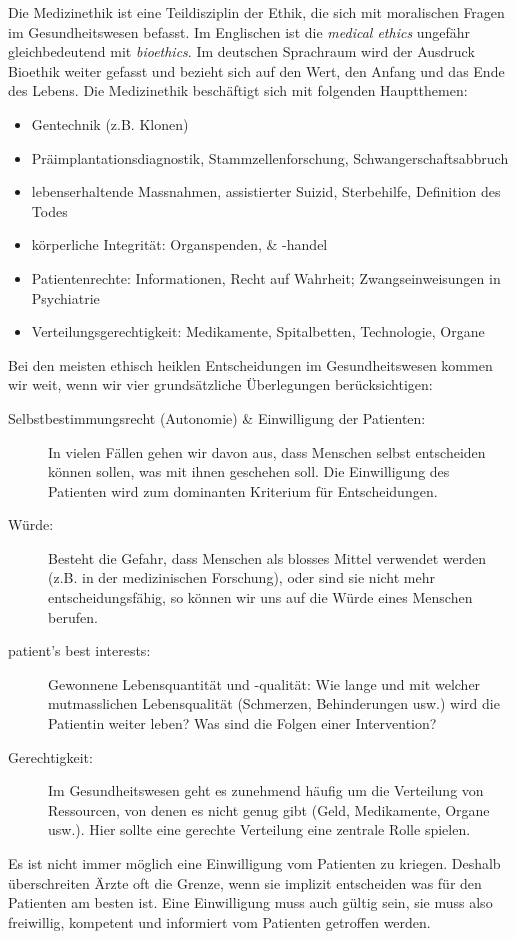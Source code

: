 Die Medizinethik ist eine Teildisziplin der Ethik, die sich mit moralischen Fragen im Gesundheitswesen befasst. Im Englischen ist die \textit{medical ethics} ungefähr gleichbedeutend mit \textit{bioethics}. Im deutschen Sprachraum wird der Ausdruck Bioethik weiter gefasst und bezieht sich auf den Wert, den Anfang und das Ende des Lebens. Die Medizinethik beschäftigt sich mit folgenden Hauptthemen:
\begin{itemize}
	\item Gentechnik (z.B. Klonen)
	\item Präimplantationsdiagnostik, Stammzellenforschung, Schwangerschaftsabbruch
	\item lebenserhaltende Massnahmen, assistierter Suizid, Sterbehilfe, Definition des Todes
	\item körperliche Integrität: Organspenden, \& -handel
	\item Patientenrechte: Informationen, Recht auf Wahrheit; Zwangseinweisungen in Psychiatrie
	\item Verteilungsgerechtigkeit: Medikamente, Spitalbetten, Technologie, Organe
\end{itemize}
Bei den meisten ethisch heiklen Entscheidungen im Gesundheitswesen kommen wir weit, wenn wir vier grundsätzliche Überlegungen berücksichtigen:
\begin{description}
	\item[Selbstbestimmungsrecht (Autonomie) \& Einwilligung der Patienten:] In vielen Fällen gehen wir davon aus, dass Menschen selbst entscheiden können sollen, was mit ihnen geschehen soll. Die Einwilligung des Patienten wird zum dominanten Kriterium für Entscheidungen.
	\item[Würde:] Besteht die Gefahr, dass Menschen als blosses Mittel verwendet werden (z.B. in der medizinischen	Forschung), oder sind sie nicht mehr entscheidungsfähig, so können wir uns auf die Würde eines Menschen	berufen.
	\item[patient’s best interests:] Gewonnene Lebensquantität und -qualität: Wie lange und mit welcher mutmasslichen Lebensqualität (Schmerzen, Behinderungen usw.) wird die	Patientin weiter leben? Was sind die Folgen einer Intervention?
	\item[Gerechtigkeit:] Im Gesundheitswesen geht es zunehmend häufig um die Verteilung von Ressourcen, von denen es nicht genug gibt (Geld, Medikamente, Organe usw.). Hier sollte eine gerechte Verteilung eine zentrale Rolle spielen.
\end{description}
Es ist nicht immer möglich eine Einwilligung vom Patienten zu kriegen. Deshalb überschreiten Ärzte oft die Grenze, wenn sie implizit entscheiden was für den Patienten am besten ist. Eine Einwilligung muss auch gültig sein, sie muss also freiwillig, kompetent und informiert vom Patienten getroffen werden.

